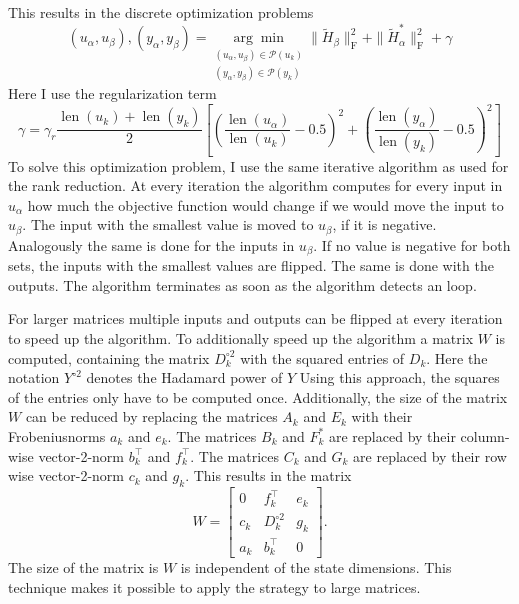 \documentclass[numbers=noenddot,doctype=mastersthesis,BCOR=15mm,biblatex]{ldvbook}%
\DeclareMathOperator{\length}{len}
\newcommand{\partition}{\mathcal{P}}
\begin{document}
This results in the discrete optimization problems
\begin{equation}
(u_\alpha,u_\beta),(y_\alpha,y_\beta) = \underset{\substack{(u_\alpha, u_\beta) \in \partition(u_k)\\(y_\alpha, y_\beta) \in \partition(y_k)
}}{\arg\min} \|\tilde{H}_\beta\|_\text{F}^2 + \|\tilde{H}_\alpha^*\|_\text{F}^2 +\gamma
\end{equation}
Here I use the regularization term
\begin{equation}
\gamma =\gamma_r \frac{\length(u_k)+\length(y_k)}{2}%
\left[ \left(\frac{\length(u_\alpha)}{\length(u_k)}-0.5\right)^2
+
\left(\frac{\length(y_\alpha)}{\length(y_k)}-0.5\right)^2
\right]
\end{equation}
To solve this optimization problem, I use the same iterative algorithm as used for the rank reduction.
At every iteration the algorithm computes for every input in $u_\alpha$ how much the objective function would change if we would move the input to $u_\beta$.
The input with the smallest value is moved to $u_\beta$, if it is negative.
Analogously the same is done for the inputs in $u_\beta$.
If no value is negative for both sets, the inputs with the smallest values are flipped.
The same is done with the outputs.
The algorithm terminates as soon as the algorithm detects an loop.


For larger matrices multiple inputs and outputs can be flipped at every iteration to speed up the algorithm.
To additionally speed up the algorithm a matrix $W$ is computed, containing the matrix $D_k^{\circ 2}$ with the squared entries of $D_k$.
Here the notation $Y^{\circ 2}$ denotes the Hadamard power of $Y$
Using this approach, the squares of the entries only have to be computed once.
Additionally, the size of the matrix $W$ can be reduced by replacing the matrices $A_k$ and $E_k$ with their Frobeniusnorms $a_k$ and $e_k$.
The matrices $B_k$ and $F_k^*$ are replaced by their column-wise vector-2-norm $b_k^\top$ and $f_k^\top$.
The matrices $C_k$ and $G_k$ are replaced by their row wise vector-2-norm $c_k$ and $g_k$.
This results in the matrix
\begin{equation}
W = 
\begin{bmatrix}
0   &f_k^\top & e_k\\
c_k & D_k^{\circ 2} & g_k\\
a_k & b_k^\top & 0
\end{bmatrix}
.
\end{equation}
The size of the matrix is $W$ is independent of the state dimensions.
This technique makes it possible to apply the strategy to large matrices.
\end{document}
